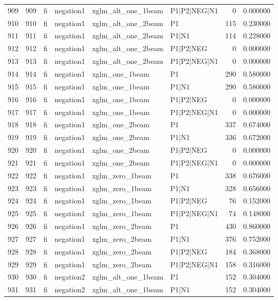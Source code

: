 \begin{tabular}{lrllllrr}
909 & 909 & fi & negation1 & xglm_alt_one_1beam & P1|P2|NEG|N1 & 0 & 0.000000 \\
910 & 910 & fi & negation1 & xglm_alt_one_2beam & P1 & 115 & 0.230000 \\
911 & 911 & fi & negation1 & xglm_alt_one_2beam & P1|N1 & 114 & 0.228000 \\
912 & 912 & fi & negation1 & xglm_alt_one_2beam & P1|P2|NEG & 0 & 0.000000 \\
913 & 913 & fi & negation1 & xglm_alt_one_2beam & P1|P2|NEG|N1 & 0 & 0.000000 \\
914 & 914 & fi & negation1 & xglm_one_1beam & P1 & 290 & 0.580000 \\
915 & 915 & fi & negation1 & xglm_one_1beam & P1|N1 & 290 & 0.580000 \\
916 & 916 & fi & negation1 & xglm_one_1beam & P1|P2|NEG & 0 & 0.000000 \\
917 & 917 & fi & negation1 & xglm_one_1beam & P1|P2|NEG|N1 & 0 & 0.000000 \\
918 & 918 & fi & negation1 & xglm_one_2beam & P1 & 337 & 0.674000 \\
919 & 919 & fi & negation1 & xglm_one_2beam & P1|N1 & 336 & 0.672000 \\
920 & 920 & fi & negation1 & xglm_one_2beam & P1|P2|NEG & 0 & 0.000000 \\
921 & 921 & fi & negation1 & xglm_one_2beam & P1|P2|NEG|N1 & 0 & 0.000000 \\
922 & 922 & fi & negation1 & xglm_zero_1beam & P1 & 338 & 0.676000 \\
923 & 923 & fi & negation1 & xglm_zero_1beam & P1|N1 & 328 & 0.656000 \\
924 & 924 & fi & negation1 & xglm_zero_1beam & P1|P2|NEG & 76 & 0.152000 \\
925 & 925 & fi & negation1 & xglm_zero_1beam & P1|P2|NEG|N1 & 74 & 0.148000 \\
926 & 926 & fi & negation1 & xglm_zero_2beam & P1 & 430 & 0.860000 \\
927 & 927 & fi & negation1 & xglm_zero_2beam & P1|N1 & 376 & 0.752000 \\
928 & 928 & fi & negation1 & xglm_zero_2beam & P1|P2|NEG & 184 & 0.368000 \\
929 & 929 & fi & negation1 & xglm_zero_2beam & P1|P2|NEG|N1 & 158 & 0.316000 \\
930 & 930 & fi & negation2 & xglm_alt_one_1beam & P1 & 152 & 0.304000 \\
931 & 931 & fi & negation2 & xglm_alt_one_1beam & P1|N1 & 152 & 0.304000 \\

\end{tabular}
